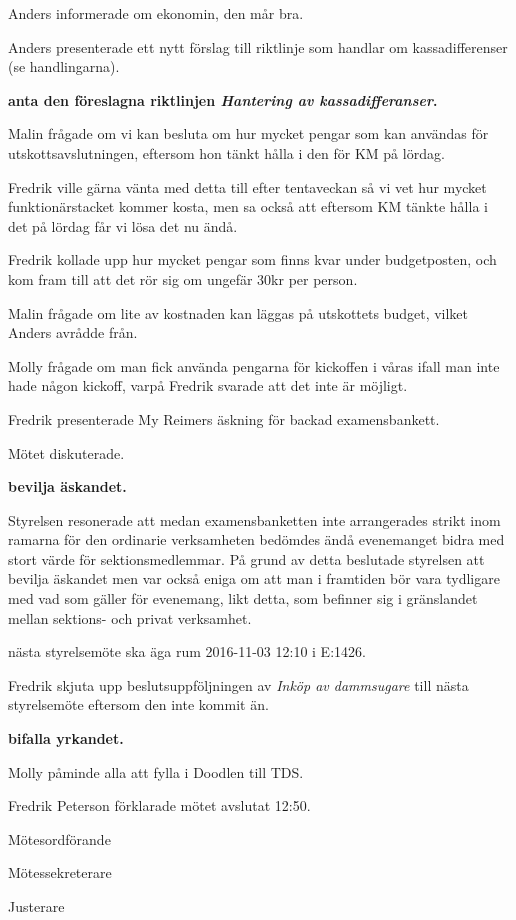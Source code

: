 \documentclass[10pt]{article}
\def\mo{Fredrik Peterson}
\def\ms{Erik Månsson}
\def\ji{Stephanie Mirsky}
\begin{document}
\begin{paragrafer}
\begin{paragrafer}
Anders informerade om ekonomin, den mår bra.

\end{paragrafer}

Anders presenterade ett nytt förslag till riktlinje som handlar om kassadifferenser (se handlingarna).

\textbf{\Mba anta den föreslagna riktlinjen \emph{Hantering av kassadifferanser}.}

Malin frågade om vi kan besluta om hur mycket pengar som kan användas för utskottsavslutningen, eftersom hon tänkt hålla i den för KM på lördag.

Fredrik ville gärna vänta med detta till efter tentaveckan så vi vet hur mycket funktionärstacket kommer kosta, men sa också att eftersom KM tänkte hålla i det på lördag får vi lösa det nu ändå.

Fredrik kollade upp hur mycket pengar som finns kvar under budgetposten, och kom fram till att det rör sig om ungefär 30kr per person.

Malin frågade om lite av kostnaden kan läggas på utskottets budget, vilket Anders avrådde från.

Molly frågade om man fick använda pengarna för kickoffen i våras ifall man inte hade någon kickoff, varpå Fredrik svarade att det inte är möjligt.

Fredrik presenterade My Reimers äskning för backad examensbankett.

Mötet diskuterade.

\textbf{\Mba bevilja äskandet.}

Styrelsen resonerade att medan examensbanketten inte arrangerades strikt inom ramarna för den ordinarie verksamheten bedömdes ändå evenemanget bidra med stort värde för sektionsmedlemmar. På grund av detta beslutade styrelsen att bevilja äskandet men var också eniga om att man i framtiden bör vara tydligare med vad som gäller för evenemang, likt detta, som befinner sig i gränslandet mellan sektions- och privat verksamhet.

\Mba nästa styrelsemöte ska äga rum 2016-11-03 12:10 i E:1426.

Fredrik \ypa skjuta upp beslutsuppföljningen av \emph{Inköp av dammsugare} till nästa styrelsemöte eftersom den inte kommit än.

\textbf{\Mba bifalla yrkandet.}

Molly påminde alla att fylla i Doodlen till TDS.

{\mo} förklarade mötet avslutat 12:50.

\end{paragrafer}

\hidesignfoot
\begin{signatures}{3}
\signature{\mo}{Mötesordförande}
\signature{\ms}{Mötessekreterare}
\signature{\ji}{Justerare}
\end{signatures}
\end{document}
